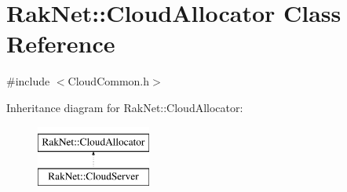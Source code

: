 \hypertarget{class_rak_net_1_1_cloud_allocator}{\section{Rak\-Net\-:\-:Cloud\-Allocator Class Reference}
\label{class_rak_net_1_1_cloud_allocator}
}


{\ttfamily \#include $<$Cloud\-Common.\-h$>$}

Inheritance diagram for Rak\-Net\-:\-:Cloud\-Allocator\-:\begin{figure}[H]
\begin{center}
\leavevmode
\includegraphics[height=2.000000cm]{class_rak_net_1_1_cloud_allocator}
\end{center}
\end{figure}
